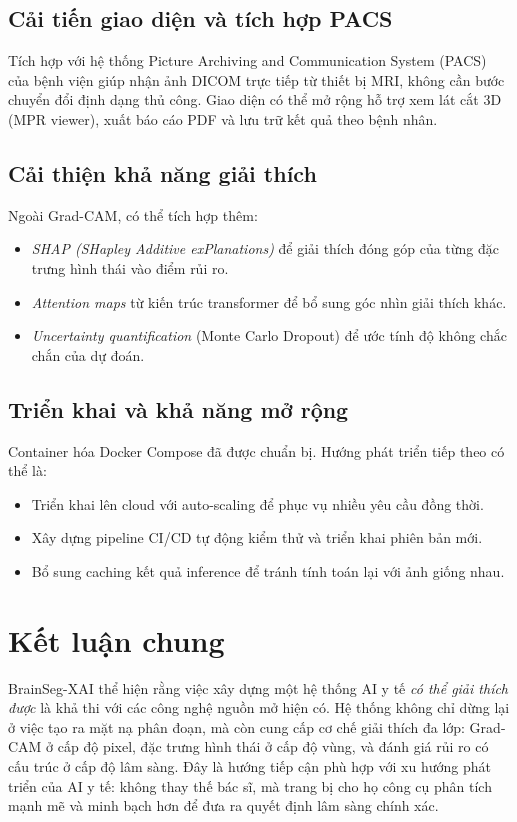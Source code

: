 \subsection{Cải tiến giao diện và tích hợp PACS}

Tích hợp với hệ thống Picture Archiving and Communication System (PACS) của bệnh viện giúp nhận ảnh DICOM trực tiếp từ thiết bị MRI, không cần bước chuyển đổi định dạng thủ công. Giao diện có thể mở rộng hỗ trợ xem lát cắt 3D (MPR viewer), xuất báo cáo PDF và lưu trữ kết quả theo bệnh nhân.

\subsection{Cải thiện khả năng giải thích}

Ngoài Grad-CAM, có thể tích hợp thêm:
\begin{itemize}
    \item \textit{SHAP (SHapley Additive exPlanations)} để giải thích đóng góp của từng đặc trưng hình thái vào điểm rủi ro.
    \item \textit{Attention maps} từ kiến trúc transformer để bổ sung góc nhìn giải thích khác.
    \item \textit{Uncertainty quantification} (Monte Carlo Dropout) để ước tính độ không chắc chắn của dự đoán.
\end{itemize}

\subsection{Triển khai và khả năng mở rộng}

Container hóa Docker Compose đã được chuẩn bị. Hướng phát triển tiếp theo có thể là:
\begin{itemize}
    \item Triển khai lên cloud với auto-scaling để phục vụ nhiều yêu cầu đồng thời.
    \item Xây dựng pipeline CI/CD tự động kiểm thử và triển khai phiên bản mới.
    \item Bổ sung caching kết quả inference để tránh tính toán lại với ảnh giống nhau.
\end{itemize}

\section{Kết luận chung}

BrainSeg-XAI thể hiện rằng việc xây dựng một hệ thống AI y tế \textit{có thể giải thích được} là khả thi với các công nghệ nguồn mở hiện có. Hệ thống không chỉ dừng lại ở việc tạo ra mặt nạ phân đoạn, mà còn cung cấp cơ chế giải thích đa lớp: Grad-CAM ở cấp độ pixel, đặc trưng hình thái ở cấp độ vùng, và đánh giá rủi ro có cấu trúc ở cấp độ lâm sàng. Đây là hướng tiếp cận phù hợp với xu hướng phát triển của AI y tế: không thay thế bác sĩ, mà trang bị cho họ công cụ phân tích mạnh mẽ và minh bạch hơn để đưa ra quyết định lâm sàng chính xác.

